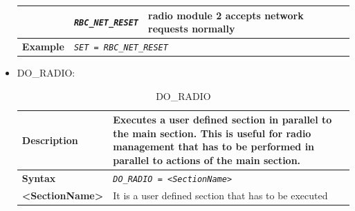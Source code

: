 \documentclass{template/openetcs}
\begin{document}
\begin{itemize}
\begin{longtable}{|l|l|l|}
				\hline
				
				&	\begin{minipage}[t]{0.40\linewidth} \emph{\texttt{RBC\_NET\_RESET}} \end{minipage}
				&	\begin{minipage}[t]{0.38\linewidth} radio module 2 accepts network requests normally \end{minipage}\\
				
				\hline
															
					\begin{minipage}[t]{0.22\linewidth} \textbf{Example} \end{minipage}
				&	\multicolumn{2}{l|}{ \begin{minipage}[t]{0.78\linewidth} \emph{\texttt{SET = RBC\_NET\_RESET}} \end{minipage} } \\
				
				\hline \hline
				
			\end{longtable}
			
		\item DO\_RADIO:									
			
			\begin{longtable}{|l|l|}
				\caption{DO\_RADIO}\\ 
				\hline
				
					\begin{minipage}[t]{0.22\linewidth} \textbf{Description} \end{minipage} 
				&	\begin{minipage}[t]{0.78\linewidth} Executes a user defined section in parallel to the main section. This is useful for radio management that has to be performed in parallel to actions of the main section. \end{minipage} \\
												
				\hline
								
					\begin{minipage}[t]{0.22\linewidth} \textbf{Syntax}	\end{minipage}
				&	\begin{minipage}[t]{0.78\linewidth }\emph{\texttt{DO\_RADIO = <SectionName>}} \end{minipage} \\
				
				\hline
				
					\begin{minipage}[t]{0.22\linewidth} \textbf{<SectionName>} \end{minipage}
				&	\begin{minipage}[t]{0.78\linewidth} It is a user defined section that has to be executed \end{minipage} \\
				

\end{longtable}
\end{itemize}
\end{document}
